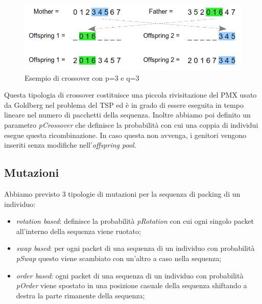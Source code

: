 \begin{figure}[htb]
  \centering
  \includegraphics[height=0.25\textwidth]{./img/crossover.png}
  \caption{Esempio di crossover con p=3  e q=3}
  \label{img:crossover}
\end{figure}

Questa tipologia di crossover costituisce una piccola rivisitazione del PMX usato da Goldberg nel problema del TSP ed è in grado di essere eseguita in tempo lineare nel numero di pacchetti della sequenza. Inoltre abbiamo poi definito un parametro \emph{pCrossover} che definisce la probabilità con cui una coppia di individui esegue questa ricombinazione. In caso questa non avvenga, i genitori vengono inseriti senza modifiche nell'\emph{offspring pool}.

\subsection{Mutazioni}
Abbiamo previsto 3 tipologie di mutazioni per la sequenza di packing di un individuo:
\begin{itemize}
\item \emph{rotation based}: definisce la probabilità \emph{pRotation} con cui ogni singolo packet all'interno della sequenza viene ruotato;
\item \emph{swap based}: per ogni packet di una sequenza di un individuo con probabilità \emph{pSwap} questo viene scambiato con un'altro a caso nella sequenza;
\item \emph{order based}: ogni packet di una sequenza di un individuo con probabilità \emph{pOrder} viene spostato in una posizione casuale della sequenza shiftando a destra la parte rimanente della sequenza;
\end{itemize}

